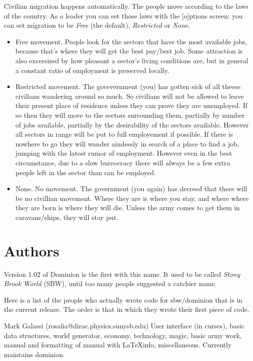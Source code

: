 Civilian migration happens automatically.  The people move according to
the laws of the country.  As a leader you can set those laws with the
[o]ptions screen:  you can set migration to be \emph{Free} (the default),
\emph{Restricted} or \emph{None}.

\begin{itemize}
\item Free
movement.  People look for the sectors that have the most
available jobs, because that's where they will get the best pay/best
job.  Some attraction is also excersized by how pleasant a sector's
living conditions are, but in general a constant ratio of employment
is preserved locally.
\item Restricted
movement.  The govevernment (you) has gotten sick of all theese
civilians wandering around so much.  So civilians will not be allowed
to leave their present place of residence unless they can prove they
are unemployed.  If so then they will move to the sectors surrounding
them, partially by number of jobs available, partially by the
desirability of the sectors available.  However all sectors in range
will be put to full employement if possible.  If there is nowhere to
go they will wander aimlessly in search of a place to find a job,
jumping with the latest rumor of employment.  However even in the best
circumstance, due to a slow bureocracy there will always be a few
extra people left in the sector than can be employed.
\item None.
No movement.  The government (you again) has decreed that there will
be no civillian movement.  Where they are is where you stay, and where
where they are born is where they will die.  Unless the army comes to
get them in caravans/ships, they will stay put.
\end{itemize}

\chapter{Authors}
Version 1.02 of Dominion is the first with this name.  It used to be
called \emph{Stony Brook World} (SBW), until too many people suggested
a catchier name.

Here is a list of the people who actually wrote code for sbw/dominion
that is in the current release.  The order is that in which they wrote
their first piece of code.

Mark Galassi (rosalia@dirac.physics.sunysb.edu) User interface (in
curses), basic data structures, world generator, economy, technology,
magic, basic army work, manual and formatting of manual with
LaTeXinfo, miscellaneous.  Currently maintains dominion.

